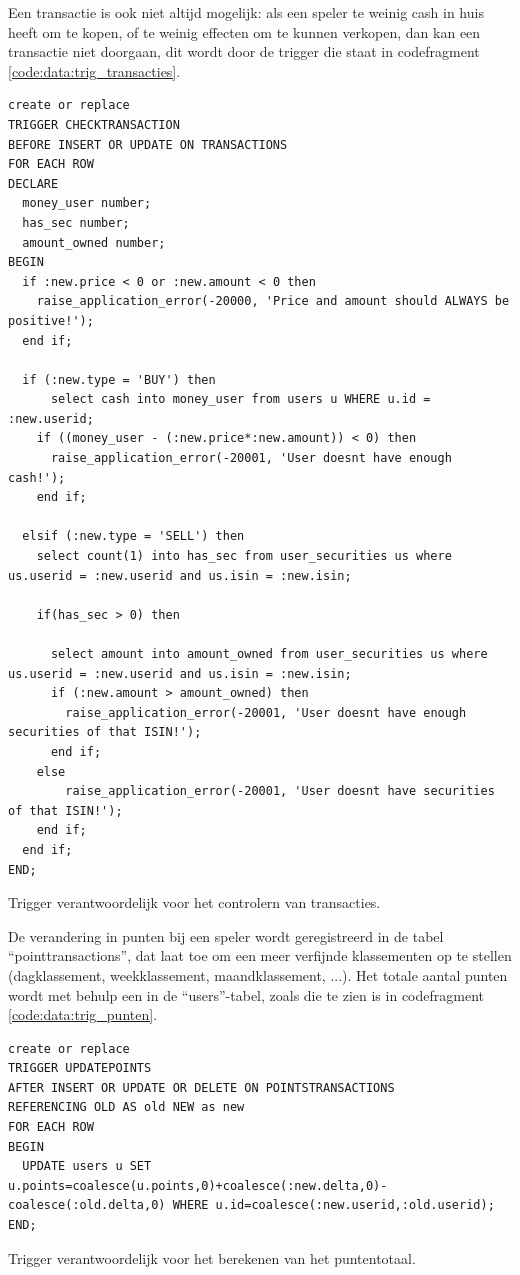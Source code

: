 Een transactie is ook niet altijd mogelijk: als een speler te weinig cash in huis heeft om te kopen, of te weinig effecten om te kunnen verkopen, dan kan een transactie niet doorgaan, dit wordt door de trigger die staat in codefragment \ref{code:data:trig_transacties}.

\begin{code}
\begin{lstlisting}
create or replace
TRIGGER CHECKTRANSACTION
BEFORE INSERT OR UPDATE ON TRANSACTIONS 
FOR EACH ROW 
DECLARE
  money_user number;
  has_sec number;
  amount_owned number;
BEGIN
  if :new.price < 0 or :new.amount < 0 then
    raise_application_error(-20000, 'Price and amount should ALWAYS be positive!');
  end if;
    
  if (:new.type = 'BUY') then
      select cash into money_user from users u WHERE u.id = :new.userid;
    if ((money_user - (:new.price*:new.amount)) < 0) then
      raise_application_error(-20001, 'User doesnt have enough cash!');
    end if;

  elsif (:new.type = 'SELL') then
    select count(1) into has_sec from user_securities us where us.userid = :new.userid and us.isin = :new.isin;
    
    if(has_sec > 0) then 
    
      select amount into amount_owned from user_securities us where us.userid = :new.userid and us.isin = :new.isin;
      if (:new.amount > amount_owned) then
        raise_application_error(-20001, 'User doesnt have enough securities of that ISIN!');
      end if;
    else
        raise_application_error(-20001, 'User doesnt have securities of that ISIN!');
    end if;
  end if;
END;
\end{lstlisting}
\caption{Trigger verantwoordelijk voor het controlern van transacties.}
\label{code:data:trig_transacties}
\end{code}


De verandering in punten bij een speler wordt geregistreerd in de tabel ``pointtransactions'', dat laat toe om een meer verfijnde klassementen op te stellen (dagklassement, weekklassement, maandklassement, ...). Het totale aantal punten wordt met behulp een in de ``users''-tabel, zoals die te zien is in codefragment \ref{code:data:trig_punten}.

\begin{code}
\begin{lstlisting}
create or replace
TRIGGER UPDATEPOINTS
AFTER INSERT OR UPDATE OR DELETE ON POINTSTRANSACTIONS 
REFERENCING OLD AS old NEW as new
FOR EACH ROW 
BEGIN
  UPDATE users u SET u.points=coalesce(u.points,0)+coalesce(:new.delta,0)-coalesce(:old.delta,0) WHERE u.id=coalesce(:new.userid,:old.userid);
END;
\end{lstlisting}
\caption{Trigger verantwoordelijk voor het berekenen van het puntentotaal.}
\label{code:data:trig_punten}
\end{code}

